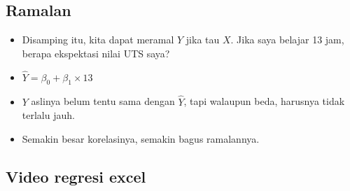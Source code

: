 \documentclass[
  letterpaper,
  DIV=11,
  numbers=noendperiod]{scrartcl}
\begin{document}
\subsection{Ramalan}\label{ramalan}

\begin{itemize}
\item
  Disamping itu, kita dapat meramal \(Y\) jika tau \(X\). Jika saya
  belajar 13 jam, berapa ekspektasi nilai UTS saya?
\item
  \(\hat{Y}=\beta_0+\beta_1 \times 13\)
\item
  \(Y\) aslinya belum tentu sama dengan \(\hat{Y}\), tapi walaupun beda,
  harusnya tidak terlalu jauh.
\item
  Semakin besar korelasinya, semakin bagus ramalannya.
\end{itemize}

\subsection{Video regresi excel}\label{video-regresi-excel}
\end{document}

